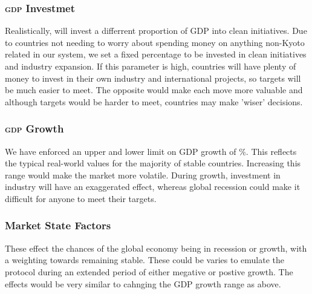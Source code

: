 \subsubsection{\textsc{gdp} Investmet}

Realistically, will invest a differrent proportion of GDP into clean initiatives. Due to countries not needing to worry about spending money on anything non-Kyoto related in our system, we set a fixed percentage to be invested in clean initiatives and industry expansion. If this parameter is high, countries will have plenty of money to invest in their own industry and international projects, so targets will be much easier to meet. The opposite would make each move more valuable and although targets would be harder to meet, countries may make 'wiser' decisions.

\subsubsection{\textsc{gdp} Growth}

We have enforced an upper and lower limit on GDP growth of \+\/\%. This reflects the typical real-world values for the majority of stable countries. Increasing this range would make the market more volatile. During growth, investment in industry will have an exaggerated effect, whereas global recession could make it difficult for anyone to meet their targets.

\subsubsection{Market State Factors}

These effect the chances of the global economy being in recession or growth, with a weighting towards remaining stable. These could be varies to emulate the protocol during an extended period of either megative or postive growth. The effects would be very similar to cahnging the GDP growth range as above.